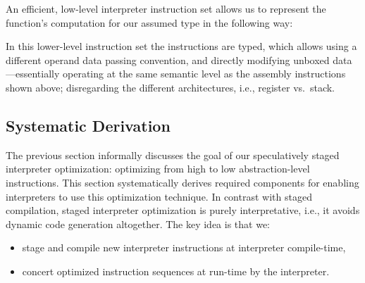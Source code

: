 \documentclass[preprint,10pt]{popl14conf}
\begin{document}
An efficient, low-level interpreter instruction set allows us to represent the \pySum{} function's
computation for our assumed type in the following way:
\begin{center}
\end{center}

In this lower-level instruction set the instructions are typed, which allows using a different
operand data passing convention, and directly modifying unboxed data---essentially operating at the
same semantic level as the assembly instructions shown above; disregarding the different
architectures, i.e., register vs.~stack.




\subsection{Systematic Derivation}\label{ss:theory}

The previous section informally discusses the goal of our speculatively staged interpreter
optimization: optimizing from high to low abstraction-level instructions.
This section systematically derives required components for enabling interpreters to use this
optimization technique.
In contrast with staged compilation, staged interpreter optimization is purely interpretative, i.e.,
it avoids dynamic code generation altogether.
The key idea is that we:
\begin{itemize}
\item stage and compile new interpreter instructions at interpreter compile-time,
\item concert optimized instruction sequences at run-time by the interpreter.
\end{itemize}
\end{document}
